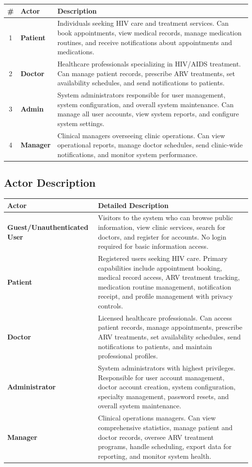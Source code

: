 \documentclass[12pt,a4paper]{article}
\begin{document}
\begin{longtable}{|c|p{3cm}|p{10cm}|}
\hline
\textbf{\#} & \textbf{Actor} & \textbf{Description} \\
\hline
1 & \textbf{Patient} & Individuals seeking HIV care and treatment services. Can book appointments, view medical records, manage medication routines, and receive notifications about appointments and medications. \\
\hline
2 & \textbf{Doctor} & Healthcare professionals specializing in HIV/AIDS treatment. Can manage patient records, prescribe ARV treatments, set availability schedules, and send notifications to patients. \\
\hline
3 & \textbf{Admin} & System administrators responsible for user management, system configuration, and overall system maintenance. Can manage all user accounts, view system reports, and configure system settings. \\
\hline
4 & \textbf{Manager} & Clinical managers overseeing clinic operations. Can view operational reports, manage doctor schedules, send clinic-wide notifications, and monitor system performance. \\
\hline
\end{longtable}

\subsection{Actor Description}

\begin{longtable}{|p{3cm}|p{11cm}|}
\hline
\textbf{Actor} & \textbf{Detailed Description} \\
\hline
\textbf{Guest/Unauthenticated User} & Visitors to the system who can browse public information, view clinic services, search for doctors, and register for accounts. No login required for basic information access. \\
\hline
\textbf{Patient} & Registered users seeking HIV care. Primary capabilities include appointment booking, medical record access, ARV treatment tracking, medication routine management, notification receipt, and profile management with privacy controls. \\
\hline
\textbf{Doctor} & Licensed healthcare professionals. Can access patient records, manage appointments, prescribe ARV treatments, set availability schedules, send notifications to patients, and maintain professional profiles. \\
\hline
\textbf{Administrator} & System administrators with highest privileges. Responsible for user account management, doctor account creation, system configuration, specialty management, password resets, and overall system maintenance. \\
\hline
\textbf{Manager} & Clinical operations managers. Can view comprehensive statistics, manage patient and doctor records, oversee ARV treatment programs, handle scheduling, export data for reporting, and monitor system health. \\
\hline
\end{longtable}
\end{document}
